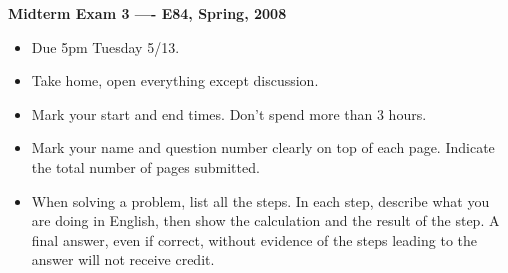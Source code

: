 \usepackage{html}

\begin{center}
{\Large \bf  Midterm Exam 3 ---- E84, Spring, 2008}
\end{center}

\begin{itemize}
\item Due 5pm Tuesday 5/13.
\item Take home, open everything except discussion.
\item Mark your start and end times. Don't spend more than 3 hours.
\item Mark your name and question number clearly on top of each page.
	Indicate the total number of pages submitted.
\item When solving a problem, list all the steps. In each step, describe 
	what you are doing in English, then show the calculation and the 
	result of the step. A final answer, even if correct, without 
	evidence of the steps leading to the answer will not receive credit.
\end{itemize}

